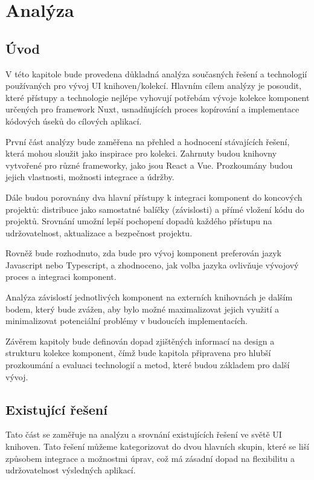 
\chapter{Analýza}

\section{Úvod}
V této kapitole bude provedena důkladná analýza současných řešení a technologií používaných pro vývoj UI knihoven/kolekcí. Hlavním cílem analýzy je posoudit, které přístupy a technologie nejlépe vyhovují potřebám vývoje kolekce komponent určených pro framework Nuxt, usnadňujících proces kopírování a implementace kódových úseků do cílových aplikací.

První část analýzy bude zaměřena na přehled a hodnocení stávajících řešení, která mohou sloužit jako inspirace pro kolekci. Zahrnuty budou knihovny vytvořené pro různé frameworky, jako jsou React a Vue. Prozkoumány budou jejich vlastnosti, možnosti integrace a údržby.

Dále budou porovnány dva hlavní přístupy k integraci komponent do koncových projektů: distribuce jako samostatné balíčky (závislosti) a přímé vložení kódu do projektů. Srovnání umožní lepší pochopení dopadů každého přístupu na udržovatelnost, aktualizace a bezpečnost projektu.

Rovněž bude rozhodnuto, zda bude pro vývoj komponent preferován jazyk Javascript nebo Typescript, a zhodnoceno, jak volba jazyka ovlivňuje vývojový proces a integraci komponent.

Analýza závislostí jednotlivých komponent na externích knihovnách je dalším bodem, který bude zvážen, aby bylo možné maximalizovat jejich využití a minimalizovat potenciální problémy v budoucích implementacích.

Závěrem kapitoly bude definován dopad zjištěných informací na design a strukturu kolekce komponent, čímž bude kapitola připravena pro hlubší prozkoumání a evaluaci technologií a metod, které budou základem pro další vývoj.

\section{Existující řešení}

Tato část se zaměřuje na analýzu a srovnání existujících řešení ve světě UI knihoven. Tato řešení můžeme kategorizovat do dvou hlavních skupin, které se liší způsobem integrace a možnostmi úprav, což má zásadní dopad na flexibilitu a udržovatelnost výsledných aplikací.

